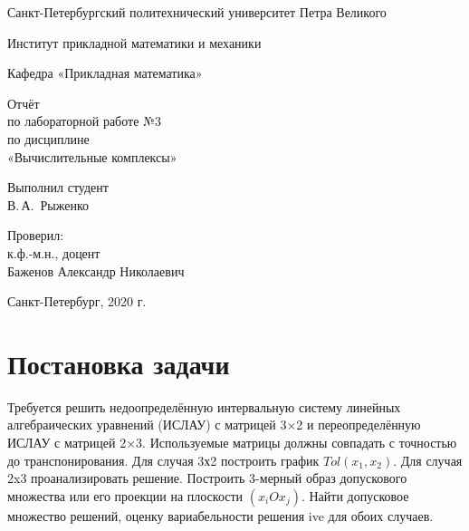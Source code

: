 \documentclass[12pt,a4paper]{scrartcl}
\begin{document}
\begin{titlepage}
  \begin{center}

    Санкт-Петербургский политехнический университет Петра Великого

    \vspace{0.25cm}
    
    Институт прикладной математики и механики
    
    Кафедра «Прикладная математика»
    \vfill

	\vspace{0.25cm}
	    Отчёт\\
	по лабораторной работе №3\\
	по дисциплине\\
	«Вычислительные комплексы»

  \bigskip

\end{center}
\vfill

\newlength{\ML}
\hfill\begin{minipage}{0.4\textwidth}
  Выполнил студент\\ В.\,А.~Рыженко\\
\end{minipage}%
\bigskip

\hfill\begin{minipage}{0.4\textwidth}
  Проверил:\\
к.ф.-м.н., доцент\\
Баженов Александр Николаевич\\
\end{minipage}%
\vfill

\begin{center}
  Санкт-Петербург, 2020 г.
\end{center}
\end{titlepage}

\tableofcontents
\newpage


\section{Постановка задачи}

Требуется решить недоопределённую интервальную систему линейных алгебраических уравнений (ИСЛАУ) с матрицей 3×2 и переопределённую ИСЛАУ с матрицей 2×3. Используемые матрицы должны совпадать с точностью до транспонирования. Для случая 3х2 построить график $Tol(x_1, x_2)$. Для случая 2x3 проанализировать решение. Построить 3-мерный образ допускового множества или его проекции на плоскости $(x_i O x_j)$. Найти допусковое множество решений, оценку вариабельности решения ive для обоих случаев.
\end{document}
